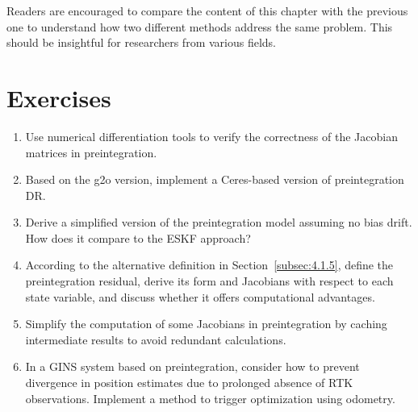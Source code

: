 Readers are encouraged to compare the content of this chapter with the previous one to understand how two different methods address the same problem. This should be insightful for researchers from various fields.

\section*{Exercises}
\begin{enumerate}
	\item Use numerical differentiation tools to verify the correctness of the Jacobian matrices in preintegration.
	\item Based on the g2o version, implement a Ceres-based version of preintegration DR.
	\item Derive a simplified version of the preintegration model assuming no bias drift. How does it compare to the ESKF approach?
	\item According to the alternative definition in Section~\ref{subsec:4.1.5}, define the preintegration residual, derive its form and Jacobians with respect to each state variable, and discuss whether it offers computational advantages.
	\item Simplify the computation of some Jacobians in preintegration by caching intermediate results to avoid redundant calculations.
	\item In a GINS system based on preintegration, consider how to prevent divergence in position estimates due to prolonged absence of RTK observations. Implement a method to trigger optimization using odometry.
\end{enumerate}

